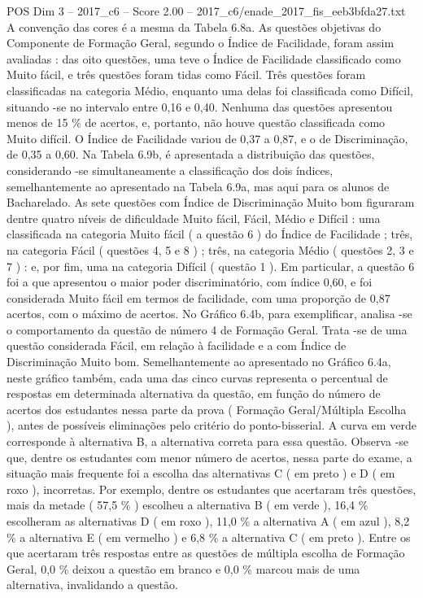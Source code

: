 \begin{textsample}{POS Dim 3 – 2017\_c6 – Score 2.00 – 2017\_c6/enade\_2017\_fis\_eeb3bfda27.txt}
A convenção das cores é a mesma da Tabela 6.8a.
As questões objetivas do Componente de Formação Geral, segundo o Índice de Facilidade, foram assim avaliadas : das oito questões, uma teve o Índice de Facilidade classificado como Muito fácil, e três questões foram tidas como Fácil.
Três questões foram classificadas na categoria Médio, enquanto uma delas foi classificada como Difícil, situando -se no intervalo entre 0,16 e 0,40.
Nenhuma das questões apresentou menos de 15 \% de acertos, e, portanto, não houve questão classificada como Muito difícil.
O Índice de Facilidade variou de 0,37 a 0,87, e o de Discriminação, de 0,35 a 0,60.
Na Tabela 6.9b, é apresentada a distribuição das questões, considerando -se simultaneamente a classificação dos dois índices, semelhantemente ao apresentado na Tabela 6.9a, mas aqui para os alunos de Bacharelado.
As sete questões com Índice de Discriminação Muito bom figuraram dentre quatro níveis de dificuldade Muito fácil, Fácil, Médio e Difícil : uma classificada na categoria Muito fácil ( a questão 6 ) do Índice de Facilidade ; três, na categoria Fácil ( questões 4, 5 e 8 ) ; três, na categoria Médio ( questões 2, 3 e 7 ) : e, por fim, uma na categoria Difícil ( questão 1 ).
Em particular, a questão 6 foi a que apresentou o maior poder discriminatório, com índice 0,60, e foi considerada Muito fácil em termos de facilidade, com uma proporção de 0,87 acertos, com o máximo de acertos.
No Gráfico 6.4b, para exemplificar, analisa -se o comportamento da questão de número 4 de Formação Geral.
Trata -se de uma questão considerada Fácil, em relação à facilidade e a com Índice de Discriminação Muito bom.
Semelhantemente ao apresentado no Gráfico 6.4a, neste gráfico também, cada uma das cinco curvas representa o percentual de respostas em determinada alternativa da questão, em função do número de acertos dos estudantes nessa parte da prova ( Formação Geral/Múltipla Escolha ), antes de possíveis eliminações pelo critério do ponto-bisserial.
A curva em verde corresponde à alternativa B, a alternativa correta para essa questão.
Observa -se que, dentre os estudantes com menor número de acertos, nessa parte do exame, a situação mais frequente foi a escolha das alternativas C ( em preto ) e D ( em roxo ), incorretas.
Por exemplo, dentre os estudantes que acertaram três questões, mais da metade ( 57,5 \% ) escolheu a alternativa B ( em verde ), 16,4 \% escolheram as alternativas D ( em roxo ), 11,0 \% a alternativa A ( em azul ), 8,2 \% a alternativa E ( em vermelho ) e 6,8 \% a alternativa C ( em preto ).
Entre os que acertaram três respostas entre as questões de múltipla escolha de Formação Geral, 0,0 \% deixou a questão em branco e 0,0 \% marcou mais de uma alternativa, invalidando a questão.

\end{textsample}
